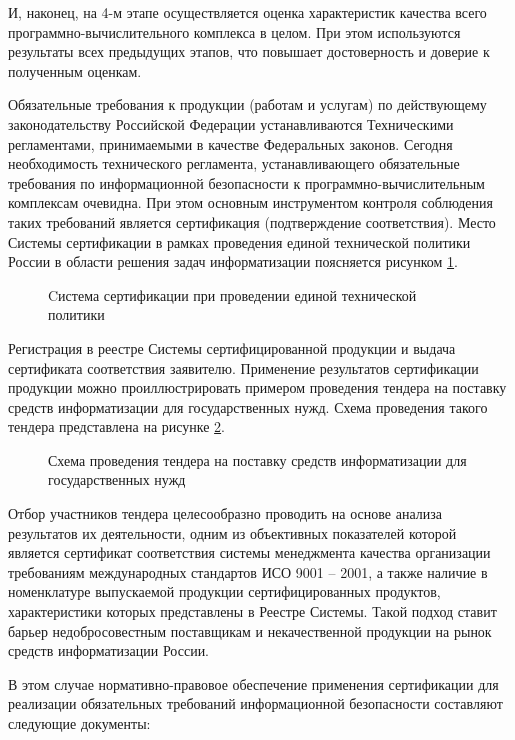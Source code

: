 И, наконец, на 4-м этапе осуществляется оценка характеристик качества всего программно-вычислительного комплекса в целом. При этом используются результаты всех предыдущих этапов, что повышает достоверность и доверие к полученным оценкам.

Обязательные требования к продукции (работам и услугам) по действующему законодательству Российской Федерации устанавливаются Техническими регламентами, принимаемыми в качестве Федеральных законов. Сегодня необходимость технического регламента, устанавливающего обязательные требования по информационной безопасности к программно-вычислительным комплексам очевидна. При этом основным инструментом контроля соблюдения таких требований является сертификация (подтверждение соответствия). Место Системы сертификации в рамках проведения единой технической политики России в области решения задач информатизации поясняется рисунком \ref{sistsert:pon2}.

\begin{figure}[h!]
\caption{Cистема сертификации при проведении единой технической политики}
\label{sistsert:pon2}
\end{figure}

Регистрация в реестре Системы сертифицированной продукции и выдача сертификата соответствия заявителю.
Применение результатов сертификации продукции можно проиллюстрировать примером проведения тендера на поставку средств информатизации для государственных нужд. Схема проведения такого тендера представлена на рисунке \ref{tender:pon3}.

\begin{figure}[h!]
\caption{Схема проведения тендера на поставку средств информатизации для государственных нужд}
\label{tender:pon3}
\end{figure}

Отбор участников тендера целесообразно проводить на основе анализа результатов их деятельности, одним из объективных показателей которой является сертификат соответствия системы менеджмента качества организации требованиям международных стандартов ИСО 9001 – 2001, а также наличие в номенклатуре выпускаемой продукции сертифицированных продуктов, характеристики которых представлены в Реестре Системы. Такой подход ставит барьер недобросовестным поставщикам и некачественной продукции на рынок средств информатизации России.

В этом случае нормативно-правовое обеспечение применения сертификации для реализации обязательных требований информационной безопасности составляют следующие документы:

